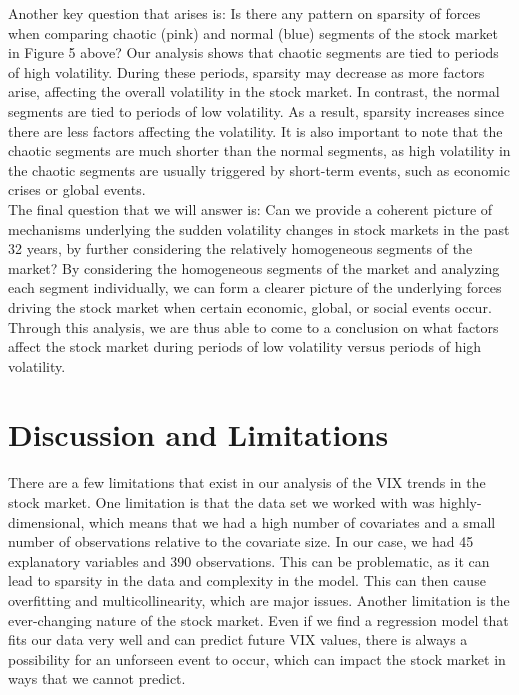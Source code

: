 \documentclass{article}
\begin{document}
Another key question that arises is: Is there any pattern on sparsity of forces when comparing chaotic (pink) and normal (blue) segments of the stock market in Figure 5 above? Our analysis shows that chaotic segments are tied to periods of high volatility. During these periods, sparsity may decrease as more factors arise, affecting the overall volatility in the stock market. In contrast, the normal segments are tied to periods of low volatility. As a result, sparsity increases since there are less factors affecting the volatility. It is also important to note that the chaotic segments are much shorter than the normal segments, as high volatility in the chaotic segments are usually triggered by short-term events, such as economic crises or global events.\\

The final question that we will answer is: Can we provide a coherent picture of mechanisms underlying the sudden volatility changes in stock markets in the past 32 years, by further considering the relatively homogeneous segments of the market? By considering the homogeneous segments of the market and analyzing each segment individually, we can form a clearer picture of the underlying forces driving the stock market when certain economic, global, or social events occur.  Through this analysis, we are thus able to come to a conclusion on what factors affect the stock market during periods of low volatility versus periods of high volatility.

\section{Discussion and Limitations}
There are a few limitations that exist in our analysis of the VIX trends in the stock market. One limitation is that the data set we worked with was highly-dimensional, which means that we had a high number of covariates and a small number of observations relative to the covariate size. In our case, we had 45 explanatory variables and 390 observations. This can be problematic, as it can lead to sparsity in the data and complexity in the model. This can then cause overfitting and multicollinearity, which are major issues. Another limitation is the ever-changing nature of the stock market. Even if we find a regression model that fits our data very well and can predict future VIX values, there is always a possibility for an unforseen event to occur, which can impact the stock market in ways that we cannot predict.\\
\end{document}
